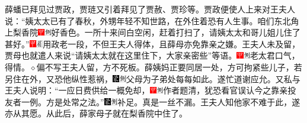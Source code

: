 薛蟠已拜见过贾政，贾琏又引着拜见了贾赦、贾珍等。贾政便使人上来对王夫人说：“姨太太已有了春秋，外甥年轻不知世路，在外住着恐有人生事。咱们东北角上梨香院{\includegraphics[width=3mm]{../Images/00002}\includegraphics[width=3mm]{../Images/00011}\footnotesize \kaishu 好香色。}一所十来间白空闲，赶着打扫了，请姨太太和哥儿姐儿住了甚好。”{\includegraphics[width=3mm]{../Images/00002}\includegraphics[width=3mm]{../Images/00010}\footnotesize \kaishu 用政老一段，不但王夫人得体，且薛母亦免靠亲之嫌。}王夫人未及留，贾母也就遣人来说“请姨太太就在这里住下，大家亲密些”等语。{\includegraphics[width=3mm]{../Images/00002}\includegraphics[width=3mm]{../Images/00011}\footnotesize \kaishu 老太君口气，得情。{$\diamond$}偏不写王夫人留，方不死板。}薛姨妈正要同居一处，方可拘紧些儿子，若另住在外，又恐他纵性惹祸，{\includegraphics[width=3mm]{../Images/00006}\includegraphics[width=3mm]{../Images/00011}\footnotesize \kaishu 父母为子弟处每每如此。}遂忙道谢应允。又私与王夫人说明：“一应日费供给一概免却，{\includegraphics[width=3mm]{../Images/00002}\includegraphics[width=3mm]{../Images/00011}\footnotesize \kaishu 作者题清，犹恐看官误认今之靠亲投友者一例。}方是处常之法。”{\includegraphics[width=3mm]{../Images/00006}\includegraphics[width=3mm]{../Images/00011}\footnotesize \kaishu 补足。真是一丝不漏。}王夫人知他家不难于此，遂亦从其愿。从此后，薛家母子就在梨香院中住了。

